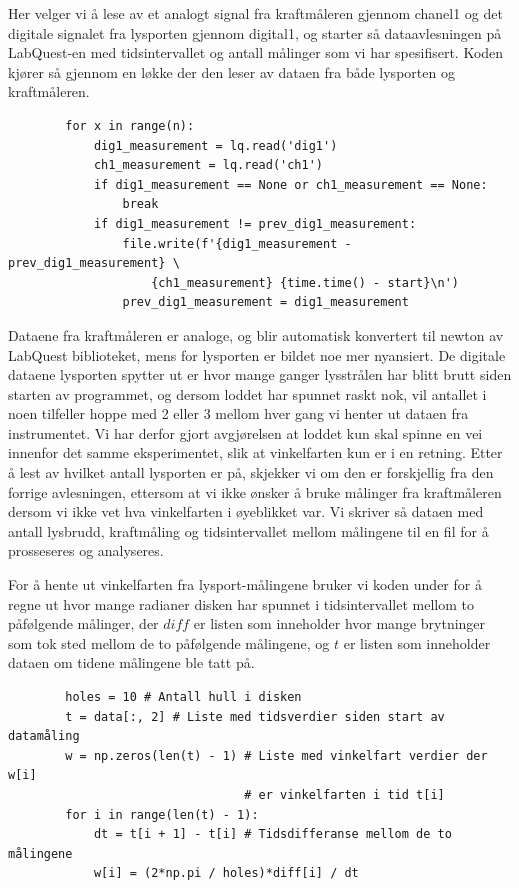 \documentclass{article}
\begin{document}
Her velger vi å lese av et analogt signal fra kraftmåleren gjennom chanel1 og det digitale signalet fra lysporten gjennom digital1,
og starter så dataavlesningen på LabQuest-en med tidsintervallet og antall målinger som vi har spesifisert. Koden kjører så gjennom en 
løkke der den leser av dataen fra både lysporten og kraftmåleren.

\begin{Codesnippet}
    \begin{verbatim}
        for x in range(n):
            dig1_measurement = lq.read('dig1')
            ch1_measurement = lq.read('ch1')
            if dig1_measurement == None or ch1_measurement == None:
                break
            if dig1_measurement != prev_dig1_measurement:
                file.write(f'{dig1_measurement - prev_dig1_measurement} \
                    {ch1_measurement} {time.time() - start}\n')
                prev_dig1_measurement = dig1_measurement
    \end{verbatim}
\end{Codesnippet}

Dataene fra kraftmåleren er analoge, og blir automatisk konvertert til newton av LabQuest biblioteket, mens for lysporten er bildet noe mer 
nyansiert. De digitale dataene lysporten spytter ut er hvor mange ganger lysstrålen har blitt brutt siden starten av programmet, og dersom 
loddet har spunnet raskt nok, vil antallet i noen tilfeller hoppe med 2 eller 3 mellom hver gang vi henter ut dataen fra instrumentet. Vi har 
derfor gjort avgjørelsen at loddet kun skal spinne en vei innenfor det samme eksperimentet, slik at vinkelfarten kun er i en retning. Etter å 
lest av hvilket antall lysporten er på, skjekker vi om den er forskjellig fra den forrige avlesningen, ettersom at vi ikke ønsker å bruke 
målinger fra kraftmåleren dersom vi ikke vet hva vinkelfarten i øyeblikket var. Vi skriver så dataen med antall lysbrudd, kraftmåling og tidsintervallet 
mellom målingene til en fil for å prosseseres og analyseres.


For å hente ut vinkelfarten fra lysport-målingene bruker vi koden under for å regne ut hvor mange radianer disken har spunnet i tidsintervallet 
mellom to påfølgende målinger, der $diff$ er listen som inneholder hvor mange brytninger som tok sted mellom de to påfølgende målingene, og $t$ 
er listen som inneholder dataen om tidene målingene ble tatt på.

\begin{Codesnippet}
    \begin{verbatim}
        holes = 10 # Antall hull i disken
        t = data[:, 2] # Liste med tidsverdier siden start av datamåling
        w = np.zeros(len(t) - 1) # Liste med vinkelfart verdier der w[i] 
                                 # er vinkelfarten i tid t[i]
        for i in range(len(t) - 1):
            dt = t[i + 1] - t[i] # Tidsdifferanse mellom de to målingene
            w[i] = (2*np.pi / holes)*diff[i] / dt
    \end{verbatim}
\end{Codesnippet}
\end{document}

